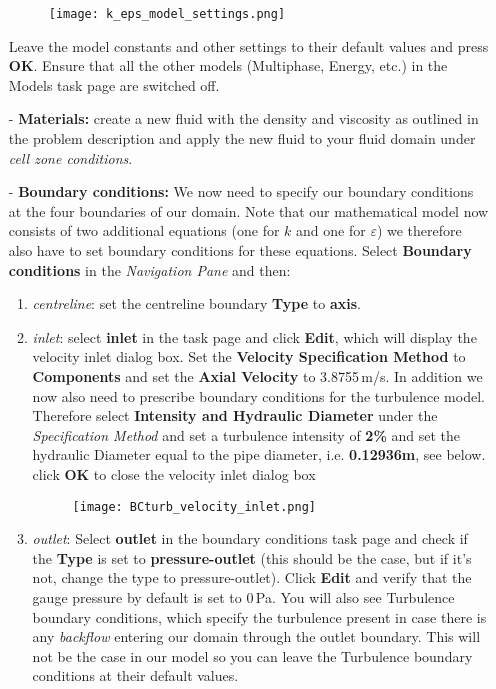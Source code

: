 \documentclass[11pt,a4paper,oneside]{scrartcl}
\newcommand\bfr[1]{\textcolor[rgb]{1,0.00,0.00}{\textbf{\textsf{#1}}}}
\begin{document}
\begin{itemize}
        \begin{figure}[H]
            \begin{center}
                \texttt{[image: k\_eps\_model\_settings.png]}
            \end{center}
        \end{figure}
        Leave the model constants and other settings to their default values and press \bfr{OK}.
        Ensure that all the other models (Multiphase, Energy, etc.) in the Models task page are switched off.
    \item[-] \textbf{Materials:} create a new fluid with the density and viscosity as outlined in the problem description and apply the new fluid to your fluid domain under \emph{cell zone conditions}.
    \item[-] \textbf{Boundary conditions:}
    We now need to  specify our boundary conditions at the four boundaries of our domain. Note that our mathematical model now consists of two additional equations (one for $k$ and one for $\varepsilon$) we therefore also have to set boundary conditions for these equations.
    Select \bfr{Boundary conditions} in the \emph{Navigation Pane} and then:
    \begin{enumerate}
        \item \emph{centreline}: set the centreline boundary \bfr{Type} to \bfr{axis}.
        \item \emph{inlet}: select \bfr{inlet} in the task page and click \bfr{Edit}, which will display the velocity inlet dialog box. Set the \bfr{Velocity Specification Method} to \bfr{Components} and set the \bfr{Axial Velocity} to 3.8755\,m/s. In addition we now also need to prescribe boundary conditions for the turbulence model. Therefore select \bfr{Intensity and Hydraulic Diameter} under the \emph{Specification Method} and set a turbulence intensity of \bfr{2\%} and set the hydraulic Diameter equal to the pipe diameter, i.e. \bfr{0.12936m}, see below. click \bfr{OK} to close the velocity inlet dialog box
            \begin{figure}[H]
            \begin{center}
            \texttt{[image: BCturb\_velocity\_inlet.png]}
            \end{center}
            \end{figure}
        \item \emph{outlet}: Select \bfr{outlet} in the boundary conditions task page and check if the \bfr{Type} is set to \bfr{pressure-outlet} (this should be the case, but if it's not, change the type to pressure-outlet). Click \bfr{Edit} and verify that the gauge pressure by default is set to 0\,Pa. You will also see Turbulence boundary conditions, which specify the turbulence present in case there is any  \emph{backflow} entering our domain through the outlet boundary. This will not be the case in our model so you can leave the Turbulence boundary conditions at their default values.

\end{enumerate}
\end{itemize}
\end{document}
